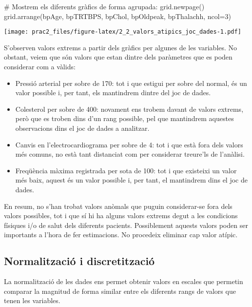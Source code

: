 \documentclass[
]{article}
\newenvironment{Shaded}{\begin{snugshade}}{\end{snugshade}}
\newcommand{\AttributeTok}[1]{\textcolor[rgb]{0.80,0.80,0.80}{#1}}
\newcommand{\CommentTok}[1]{\textcolor[rgb]{0.50,0.62,0.50}{#1}}
\newcommand{\DecValTok}[1]{\textcolor[rgb]{0.86,0.86,0.80}{#1}}
\newcommand{\FunctionTok}[1]{\textcolor[rgb]{0.94,0.94,0.56}{#1}}
\newcommand{\NormalTok}[1]{\textcolor[rgb]{0.80,0.80,0.80}{#1}}
\providecommand{\tightlist}{%
  \setlength{\itemsep}{0pt}\setlength{\parskip}{0pt}}
\begin{document}
\begin{Shaded}
\begin{Highlighting}[]
\CommentTok{\# Mostrem els diferents gràfics de forma agrupada:}
\FunctionTok{grid.newpage}\NormalTok{()}
\FunctionTok{grid.arrange}\NormalTok{(bpAge, bpTRTBPS, bpChol, bpOldpeak, bpThalachh, }\AttributeTok{ncol=}\DecValTok{3}\NormalTok{)}
\end{Highlighting}
\end{Shaded}

\texttt{[image: prac2\_files/figure-latex/2\_2\_valors\_atipics\_joc\_dades-1.pdf]}

S'observen valors extrems a partir dels gràfics per algunes de les
variables. No obstant, veiem que són valors que estan dintre dels
paràmetres que es poden considerar com a vàlids:

\begin{itemize}
\tightlist
\item
  Pressió arterial per sobre de 170: tot i que estigui per sobre del
  normal, és un valor possible i, per tant, els mantindrem dintre del
  joc de dades.
\item
  Colesterol per sobre de 400: novament ens trobem davant de valors
  extrems, però que es troben dins d'un rang possible, pel que
  mantindrem aquestes observacions dins el joc de dades a analitzar.
\item
  Canvis en l'electrocardiograma per sobre de 4: tot i que està fora
  dels valors més comuns, no està tant distanciat com per considerar
  treure'ls de l'anàlisi.
\item
  Freqüència màxima registrada per sota de 100: tot i que existeixi un
  valor més baix, aquest és un valor possible i, per tant, el mantindrem
  dins el joc de dades.
\end{itemize}

En resum, no s'han trobat valors anòmals que puguin considerar-se fora
dels valors possibles, tot i que sí hi ha alguns valors extrems degut a
les condicions físiques i/o de salut dels diferents pacients.
Possiblement aquests valors poden ser importants a l'hora de fer
estimacions. No procedeix eliminar cap valor atípic.

\hypertarget{normalitzaciuxf3-i-discretitzaciuxf3}{%
\subsection{Normalització i
discretització}\label{normalitzaciuxf3-i-discretitzaciuxf3}}

La normalització de les dades ens permet obtenir valors en escales que
permetin comparar la magnitud de forma similar entre els diferents rangs
de valors que tenen les variables.
\end{document}
